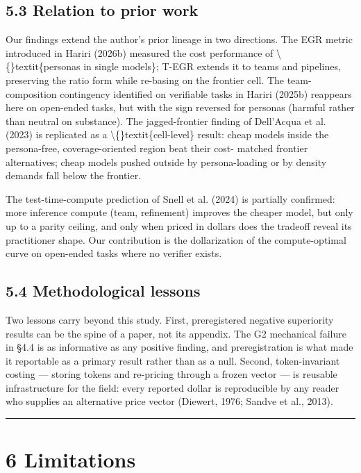 \documentclass[11pt,a4paper]{article}
\begin{document}
\subsection{5.3 Relation to prior work}

Our findings extend the author's prior lineage in two directions.
The EGR metric introduced in Hariri (2026b) measured the cost
performance of \textbackslash\{\}textit\{personas in single models\}; T-EGR extends it to
teams and pipelines, preserving the ratio form while re-basing on
the frontier cell. The team-composition contingency identified on
verifiable tasks in Hariri (2025b) reappears here on open-ended
tasks, but with the sign reversed for personas (harmful rather than
neutral on substance). The jagged-frontier finding of Dell'Acqua et
al. (2023) is replicated as a \textbackslash\{\}textit\{cell-level\} result: cheap models
inside the persona-free, coverage-oriented region beat their cost-
matched frontier alternatives; cheap models pushed outside by
persona-loading or by density demands fall below the frontier.

The test-time-compute prediction of Snell et al. (2024) is partially
confirmed: more inference compute (team, refinement) improves the
cheaper model, but only up to a parity ceiling, and only when priced
in dollars does the tradeoff reveal its practitioner shape. Our
contribution is the dollarization of the compute-optimal curve on
open-ended tasks where no verifier exists.

\subsection{5.4 Methodological lessons}

Two lessons carry beyond this study. First, preregistered negative
superiority results can be the spine of a paper, not its appendix.
The G2 mechanical failure in §4.4 is as informative as any positive
finding, and preregistration is what made it reportable as a primary
result rather than as a null. Second, token-invariant costing —
storing tokens and re-pricing through a frozen vector — is reusable
infrastructure for the field: every reported dollar is reproducible
by any reader who supplies an alternative price vector (Diewert,
1976; Sandve et al., 2013).

\hrule


\section{6 Limitations}
\end{document}
